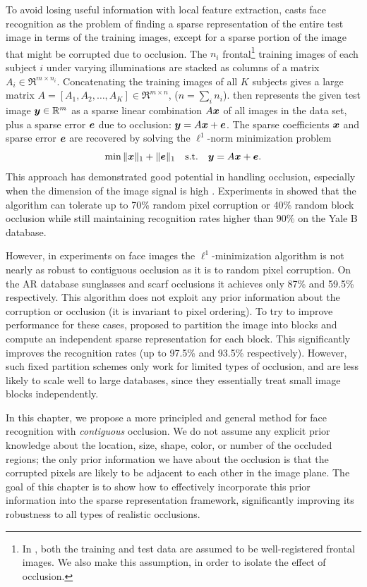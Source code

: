 To avoid losing useful information with local feature extraction,
\cite{Wright2009-PAMI} casts face recognition as the problem of finding a
sparse representation of the entire test image in terms of the training images,
except for a sparse portion of the image that might be corrupted due to
occlusion.  The $n_i$ frontal\footnote{In \cite{Wright2009-PAMI}, both the
training and test data are assumed to be well-registered frontal images. We
also make this assumption, in order to isolate the effect of occlusion.}
training images of each subject $i$ under varying illuminations are stacked as
columns of a matrix $A_i \in \Re^{m\times n_i}$. Concatenating the training
images of all $K$ subjects gives a large matrix $A = [A_1,A_2,\ldots,A_K] \in
\Re^{m\times n}$, ($n = \sum_i n_i$).  \cite{Wright2009-PAMI} then represents
the given test image ${\boldsymbol{y}} \in \mathbb R^m$ as a sparse linear combination $A {\boldsymbol{x}}$ of
all images in the data set, plus a sparse error $\boldsymbol{e}$ due to occlusion: ${\boldsymbol{y}} = A
{\boldsymbol{x}} + \boldsymbol{e}$. The sparse coefficients ${\boldsymbol{x}}$ and sparse error $\boldsymbol{e}$ are recovered by
solving the $\ell^1$-norm minimization problem
\begin{equation}
\min \|{\boldsymbol{x}}\|_1 + \|\boldsymbol{e}\|_1\quad \textup{s.t.} \quad {\boldsymbol{y}} = A {\boldsymbol{x}} + \boldsymbol{e}.
\end{equation}
This approach has demonstrated good potential in handling occlusion, especially
when the dimension of the image signal is high \cite{Wright2008-IT}.
Experiments in \cite{Wright2009-PAMI} showed that the algorithm can tolerate up
to 70\% random pixel corruption or 40\% random block occlusion while still
maintaining recognition rates higher than $90\%$ on the Yale B database.

However, in experiments on face images the $\ell^1$-minimization algorithm is
not nearly as robust to contiguous occlusion as it is to random pixel
corruption.  On the AR database sunglasses and scarf occlusions it achieves
only 87\% and 59.5\% respectively.  This algorithm does not exploit any prior
information about the corruption or occlusion (it is invariant to pixel
ordering).  To try to improve performance for these cases,
\cite{Wright2009-PAMI} proposed to partition the image into blocks and compute
an independent sparse representation for each block. This significantly
improves the recognition rates (up to 97.5\% and 93.5\% respectively). However,
such fixed partition schemes only work for limited types of occlusion, and are
less likely to scale well to large databases, since they essentially treat
small image blocks independently.

In this chapter, we propose a more principled and general method for face
recognition with {\em contiguous} occlusion. We do not assume any explicit
prior knowledge about the location, size, shape, color, or number of the
occluded regions; the only prior information we have about the occlusion is
that the corrupted pixels are likely to be adjacent to each other in the image
plane. The goal of this chapter is to show how to effectively incorporate this
prior information into the sparse representation framework, significantly
improving its robustness to all types of realistic occlusions.

